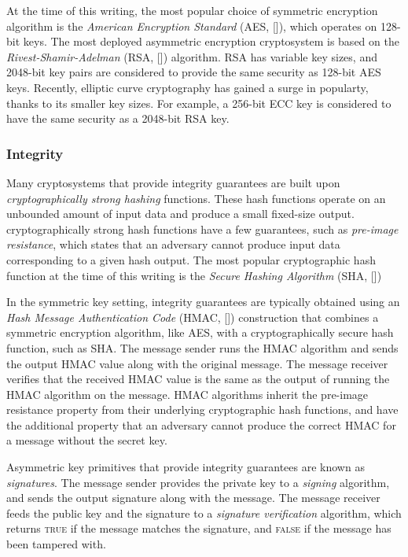 At the time of this writing, the most popular choice of symmetric encryption
algorithm is the \textit{American Encryption Standard} (AES, []), which
operates on 128-bit keys. The most deployed asymmetric encryption cryptosystem
is based on the \textit{Rivest-Shamir-Adelman} (RSA, []) algorithm. RSA has
variable key sizes, and 2048-bit key pairs are considered to provide the same
security as 128-bit AES keys. Recently, elliptic curve cryptography has gained
a surge in popularty, thanks to its smaller key sizes. For example, a 256-bit
ECC key is considered to have the same security as a 2048-bit RSA key.


\subsubsection{Integrity}

Many cryptosystems that provide integrity guarantees are built upon
\textit{cryptographically strong hashing} functions. These hash functions
operate on an unbounded amount of input data and produce a small fixed-size
output. cryptographically strong hash functions have a few guarantees, such as
\textit{pre-image resistance}, which states that an adversary cannot produce
input data corresponding to a given hash output. The most popular cryptographic
hash function at the time of this writing is the
\textit{Secure Hashing Algorithm} (SHA, [])

In the symmetric key setting, integrity guarantees are typically obtained using
an \textit{Hash Message Authentication Code} (HMAC, []) construction that
combines a symmetric encryption algorithm, like AES, with a cryptographically
secure hash function, such as SHA. The message sender runs the HMAC algorithm
and sends the output HMAC value along with the original message. The message
receiver verifies that the received HMAC value is the same as the output of
running the HMAC algorithm on the message. HMAC algorithms inherit the
pre-image resistance property from their underlying cryptographic hash
functions, and have the additional property that an adversary cannot produce
the correct HMAC for a message without the secret key.

Asymmetric key primitives that provide integrity guarantees are known as
\textit{signatures}. The message sender provides the private key to a
\textit{signing} algorithm, and sends the output signature along with the
message. The message receiver feeds the public key and the signature to a
\textit{signature verification} algorithm, which returns \textsc{true} if the
message matches the signature, and \textsc{false} if the message has been
tampered with.

